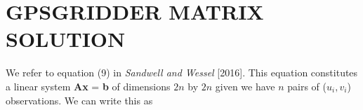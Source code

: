 \documentclass[12pt,letterpaper,margin=0.5in]{report}
\begin{document}
\section{GPSGRIDDER MATRIX SOLUTION}

We refer to equation (9) in {\it Sandwell and Wessel} [2016].  This equation constitutes a linear system {\bf Ax} = {\bf b}
of dimensions $2n$ by $2n$
given we have $n$ pairs of ($u_i, v_i$) observations. We can write this as


\end{document}

